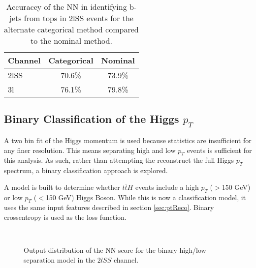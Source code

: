 \begin{table}[H]
  \centering
  \caption{Accuracey of the NN in identifying b-jets from tops in 2lSS events for the alternate categorical method compared to the nominal method.}
  \begin{tabular}{l|c|c}                                                                                                     
  \hline\hline
  Channel & Categorical & Nominal \\                                                                              
  \hline                                                                                                                  
  2lSS & 70.6\% & 73.9\% \\
  3l & 76.1\% & 79.8\% \\
  \hline                                                                                                                 
  \end{tabular}                                                                                                           
  \label{tab:topMatchCatApx}
\end{table}

\subsection{Binary Classification of the Higgs $p_T$}
\label{subsec:binPtApx}
                                                                                                                     
A two bin fit of the Higgs momentum is used because statistics are insufficient for any finer resolution. This means separating high and low $p_T$ events is sufficient for this analysis. As such, rather than attempting the reconstruct the full Higgs $p_T$ spectrum, a binary classification approach is explored.

A model is built to determine whether $t\bar{t}H$ events include a high $p_T$ ($>$150 GeV) or low $p_T$ ($<$150 GeV) Higgs Boson. While this is now a classification model, it uses the same input features described in section \ref{sec:ptReco}. Binary crossentropy is used as the loss function.

\begin{figure}[H]                                                                                                           
  \\
  \caption{Output distribution of the NN score for the binary high/low \pt separation model in the $2lSS$ channel.}
  \label{fig:bin2lSSroc}                                                                          
\end{figure}

